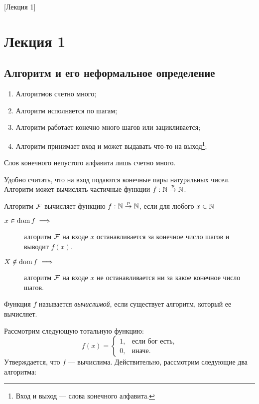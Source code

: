 [Лекция 1]
\newpage

\section{Лекция 1}

\subsection{Алгоритм и его неформальное определение}

\begin{enumerate}
    \item Алгоритмов счетно много;
    \item Алгоритм исполняется по шагам;
    \item Алгоритм работает конечно много шагов или зацикливается;
    \item Алгоритм принимает вход и может выдавать что-то на выход\footnote{Вход и выход --- слова конечного алфавита.};
\end{enumerate}

\begin{statement}
    Слов конечного непустого алфавита лишь счетно много.
\end{statement}

Удобно считать, что на вход подаются конечные пары натуральных чисел.
Алгоритм может вычислять частичные функции $f: \mathbb{N} \overset{p}{\to} \mathbb{N}$.

\begin{definition}
    Алгоритм $\mathcal{F}$ вычисляет функцию $f: \mathbb{N} \overset{p}{\to} \mathbb{N}$, если для любого $x \in \mathbb{N}$
    \begin{description}
        \item[$x \in \operatorname{dom} f \implies$] алгоритм $\mathcal{F}$ на входе $x$ останавливается за конечное число шагов и выводит $f(x)$.
        \item[$X \notin \operatorname{dom} f \implies$] алгоритм $\mathcal{F}$ на входе $x$ не останавливается ни за какое конечное число шагов.  
    \end{description}
\end{definition}

\begin{definition}
    Функция $f$ называется {\it вычислимой}, если существует алгоритм, который ее вычисляет.
\end{definition}

Рассмотрим следующую тотальную функцию:
$$
    f(x) = \begin{cases}
        1, & \text{если бог есть}, \\
        0, & \text{иначе}.
    \end{cases}
$$
Утверждается, что $f$ --- вычислима.
Действительно, рассмотрим следующие два алгоритма:

